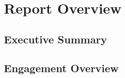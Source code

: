 \documentclass[12pt, table,dvipsnames]{article}
\begin{document}
\section{Report Overview}
\subsection{Executive Summary}



\newpage
\subsection{Engagement Overview}
\lipsum[2-4]

\end{document}
